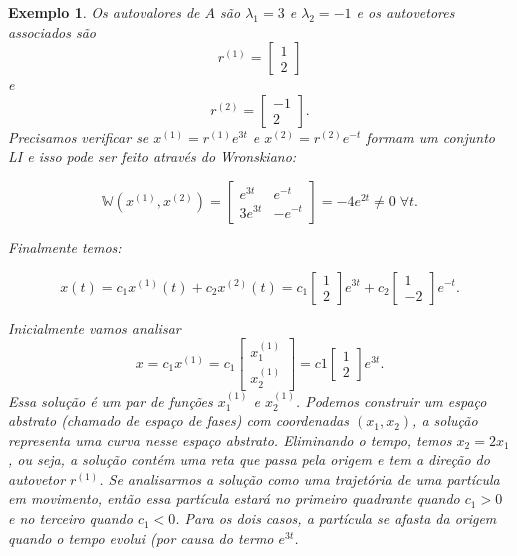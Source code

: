\documentclass[a4paper,portuguese,9pt,final]{extarticle}
\newtheorem{example}{Exemplo}[section]
\begin{document}
\begin{multicols*}{2}
\begin{example}
                  
                  

                
                Os autovalores de $A$ são $\lambda_1 = 3$ e $\lambda_2 = -1$ e os autovetores associados são 
                $$r^{(1)} = \begin{bmatrix} 1\\ 2 \end{bmatrix}$$ e  $$r^{(2)} = \begin{bmatrix} -1\\ 2 \end{bmatrix}.$$ Precisamos verificar se $x^{(1)}=r^{(1)}e^{3t}$ e $x^{(2)}=r^{(2)}e^{-t}$ formam um conjunto LI e isso pode ser feito através do Wronskiano:
                
                $$\mathbb{W}(x^{(1)}, x^{(2)}) = \begin{bmatrix} e^{3t} & e^{-t} \\ 3e^{3t} & -e^{-t}\end{bmatrix} = -4e^{2t} \neq 0 \; \forall t.$$ 
                
                Finalmente temos:
                
                \begin{equation*}
                    x(t) = c_1 x^{(1)}(t) + c_2 x^{(2)}(t) = c_1 \begin{bmatrix} 1\\ 2 \end{bmatrix}e^{3t} + c_2 \begin{bmatrix} 1\\ -2\end{bmatrix}e^{-t}.
                \end{equation*}
                
                Inicialmente vamos analisar $$x = c_1 x^{(1)} = c_1\begin{bmatrix} x_1^{(1)} \\ x_2^{(1)} \end{bmatrix} = c1 \begin{bmatrix} 1\\ 2 \end{bmatrix} e^{3t}. $$ Essa solução é um par de funções $x_1^{(1)}$ e $x_2^{(1)}$. Podemos construir um espaço abstrato (chamado de espaço de fases) com coordenadas $(x_1, x_2)$, a solução representa uma curva nesse espaço abstrato. Eliminando o tempo, temos $x_2 = 2x_1$, ou seja, a solução contém uma reta que passa pela origem e tem a direção do autovetor $r^{(1)}$. Se analisarmos a solução como uma trajetória de uma partícula em movimento, então essa partícula estará no primeiro quadrante quando $c_1 > 0$ e no terceiro quando $c_1<0$. Para os dois casos, a partícula se afasta da origem quando o tempo evolui (por causa do termo $e^{3t}$.
                

\end{example}
\end{multicols*}
\end{document}
